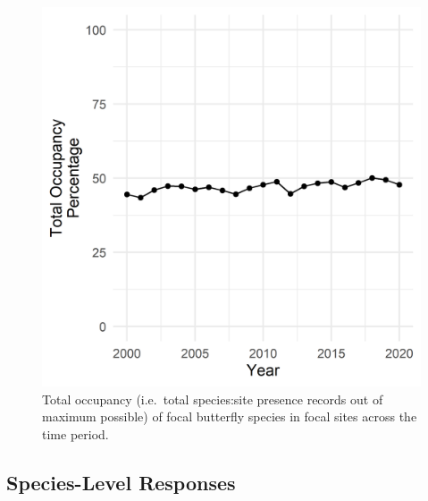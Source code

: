 \documentclass[
]{article}
\begin{document}
\begin{figure}
\centering
\includegraphics{ButterflyMarkdowns/ButterflySIFigs/TotalOccupancy.png}
\caption{Total occupancy (i.e.~total species:site presence records out
of maximum possible) of focal butterfly species in focal sites across
the time period.}
\end{figure}

\hypertarget{species-level-responses}{%
\subsection{Species-Level Responses}\label{species-level-responses}}
\end{document}
